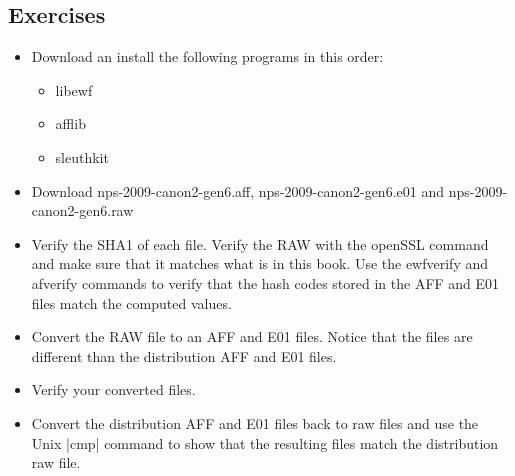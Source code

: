 \documentclass{book}
\begin{document}
\subsection{Exercises}
\begin{itemize}
\item Download an install the following programs in this order:
\begin{itemize}
\item   libewf
\item afflib
\item  sleuthkit
\end{itemize}
\item Download nps-2009-canon2-gen6.aff, nps-2009-canon2-gen6.e01 and nps-2009-canon2-gen6.raw
\item Verify the SHA1 of each file. Verify the RAW with the openSSL
  command and make sure that it matches what is in this book. Use the
  ewfverify and afverify commands to verify that the hash codes stored
  in the AFF and E01 files match the computed values.
\item Convert the RAW file to an AFF and E01 files. Notice that the
  files are different than the distribution AFF and E01 files.
\item Verify your converted files.
\item Convert the distribution AFF and E01 files back to raw files and
  use the Unix |cmp| command to show that the resulting files match
  the distribution raw file.
\end{itemize}
\end{document}
